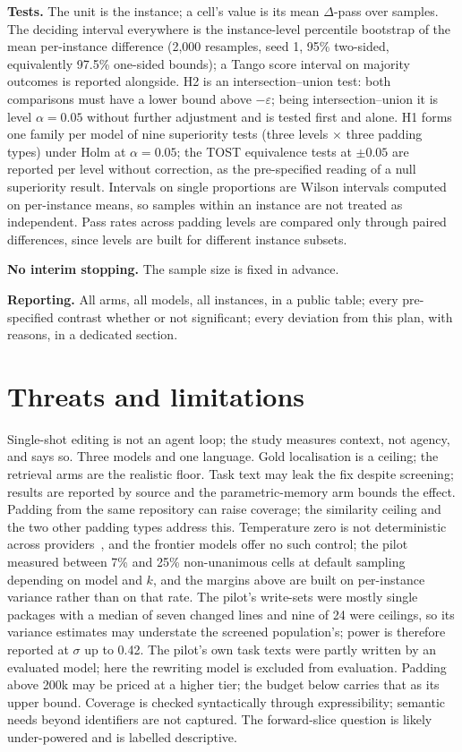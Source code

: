 \documentclass[10pt,conference]{IEEEtran}
\newcommand{\eps}{\varepsilon}
\begin{document}
\textbf{Tests.} The unit is the instance; a cell's value is its mean $\Delta$-pass over samples. The deciding interval everywhere is the instance-level percentile bootstrap of the mean per-instance difference (2,000 resamples, seed 1, 95\% two-sided, equivalently 97.5\% one-sided bounds); a Tango score interval on majority outcomes is reported alongside. H2 is an intersection--union test: both comparisons must have a lower bound above $-\eps$; being intersection--union it is level $\alpha = 0.05$ without further adjustment and is tested first and alone. H1 forms one family per model of nine superiority tests (three levels $\times$ three padding types) under Holm at $\alpha = 0.05$; the TOST equivalence tests at $\pm 0.05$ are reported per level without correction, as the pre-specified reading of a null superiority result. Intervals on single proportions are Wilson intervals computed on per-instance means, so samples within an instance are not treated as independent. Pass rates across padding levels are compared only through paired differences, since levels are built for different instance subsets.

\textbf{No interim stopping.} The sample size is fixed in advance.

\textbf{Reporting.} All arms, all models, all instances, in a public table; every pre-specified contrast whether or not significant; every deviation from this plan, with reasons, in a dedicated section.

\section{Threats and limitations}

Single-shot editing is not an agent loop; the study measures context, not agency, and says so. Three models and one language. Gold localisation is a ceiling; the retrieval arms are the realistic floor. Task text may leak the fix despite screening; results are reported by source and the parametric-memory arm bounds the effect. Padding from the same repository can raise coverage; the similarity ceiling and the two other padding types address this. Temperature zero is not deterministic across providers~\cite{bjarnason2026randomness}, and the frontier models offer no such control; the pilot measured between 7\% and 25\% non-unanimous cells at default sampling depending on model and $k$, and the margins above are built on per-instance variance rather than on that rate. The pilot's write-sets were mostly single packages with a median of seven changed lines and nine of 24 were ceilings, so its variance estimates may understate the screened population's; power is therefore reported at $\sigma$ up to 0.42. The pilot's own task texts were partly written by an evaluated model; here the rewriting model is excluded from evaluation. Padding above 200k may be priced at a higher tier; the budget below carries that as its upper bound. Coverage is checked syntactically through expressibility; semantic needs beyond identifiers are not captured. The forward-slice question is likely under-powered and is labelled descriptive.
\end{document}

